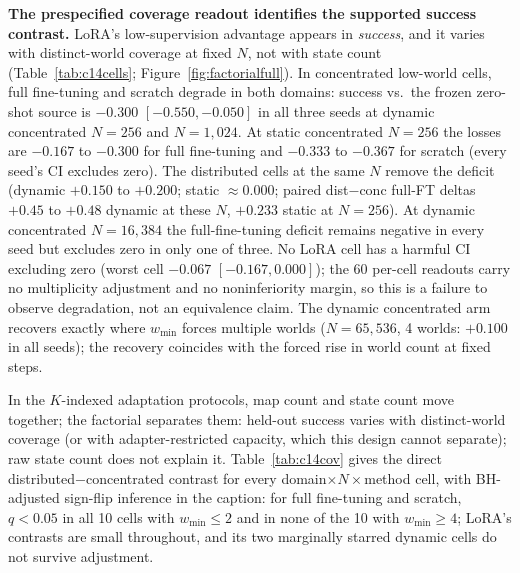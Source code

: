 \documentclass[letterpaper]{article} %
\begin{document}
\textbf{The prespecified coverage readout identifies the supported success contrast.} LoRA's low-supervision advantage appears in \emph{success}, and it varies with distinct-world coverage at fixed $N$, not with state count (Table~\ref{tab:c14cells}; Figure~\ref{fig:factorialfull}). In concentrated low-world cells, full fine-tuning and scratch degrade in both domains: success vs.\ the frozen zero-shot source is $-0.300$ $[-0.550,-0.050]$ in all three seeds at dynamic concentrated $N{=}256$ and $N{=}1{,}024$. At static concentrated $N{=}256$ the losses are $-0.167$ to $-0.300$ for full fine-tuning and $-0.333$ to $-0.367$ for scratch (every seed's CI excludes zero). The distributed cells at the same $N$ remove the deficit (dynamic $+0.150$ to $+0.200$; static $\approx 0.000$; paired dist$-$conc full-FT deltas $+0.45$ to $+0.48$ dynamic at these $N$, $+0.233$ static at $N{=}256$). At dynamic concentrated $N{=}16{,}384$ the full-fine-tuning deficit remains negative in every seed but excludes zero in only one of three. No LoRA cell has a harmful CI excluding zero (worst cell $-0.067$ $[-0.167, 0.000]$); the 60 per-cell readouts carry no multiplicity adjustment and no noninferiority margin, so this is a failure to observe degradation, not an equivalence claim. The dynamic concentrated arm recovers exactly where $w_{\min}$ forces multiple worlds ($N{=}65{,}536$, 4 worlds: $+0.100$ in all seeds); the recovery coincides with the forced rise in world count at fixed steps.

In the $K$-indexed adaptation protocols, map count and state count move together; the factorial separates them: held-out success varies with distinct-world coverage (or with adapter-restricted capacity, which this design cannot separate); raw state count does not explain it. Table~\ref{tab:c14cov} gives the direct distributed$-$concentrated contrast for every domain$\times N\times$method cell, with BH-adjusted sign-flip inference in the caption: for full fine-tuning and scratch, $q{<}0.05$ in all 10 cells with $w_{\min} \leq 2$ and in none of the 10 with $w_{\min} \geq 4$; LoRA's contrasts are small throughout, and its two marginally starred dynamic cells do not survive adjustment.
\end{document}
